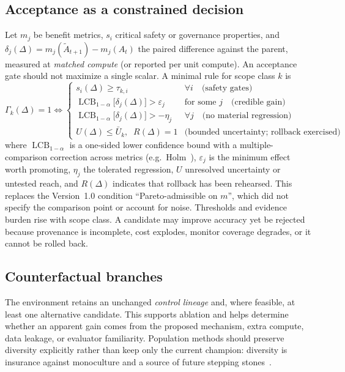\documentclass[11pt,a4paper]{article}
\newcommand{\LCB}{\operatorname{LCB}}
\begin{document}
\subsection{Acceptance as a constrained decision}
Let $m_j$ be benefit metrics, $s_i$ critical safety or governance properties, and $\delta_j(\Delta)=m_j(\tilde A_{t+1})-m_j(A_t)$ the paired difference against the parent, measured at \emph{matched compute} (or reported per unit compute). An acceptance gate should not maximize a single scalar. A minimal rule for scope class $k$ is
\begin{equation}
\Gamma_k(\Delta)=1 \iff
\begin{cases}
s_i(\Delta)\ge\tau_{k,i} & \forall i \quad\text{(safety gates)}\\
\LCB_{1-\alpha}\big[\delta_j(\Delta)\big]>\varepsilon_j & \text{for some } j \quad\text{(credible gain)}\\
\LCB_{1-\alpha}\big[\delta_j(\Delta)\big]>-\eta_j & \forall j \quad\text{(no material regression)}\\
U(\Delta)\le \bar U_k,\;\; R(\Delta)=1 & \text{(bounded uncertainty; rollback exercised)}
\end{cases}
\label{eq:accept}
\end{equation}
where $\LCB_{1-\alpha}$ is a one-sided lower confidence bound with a multiple-comparison correction across metrics (e.g.\ Holm~\cite{holm1979}), $\varepsilon_j$ is the minimum effect worth promoting, $\eta_j$ the tolerated regression, $U$ unresolved uncertainty or untested reach, and $R(\Delta)$ indicates that rollback has been rehearsed. This replaces the Version~1.0 condition ``Pareto-admissible on $m$'', which did not specify the comparison point or account for noise. Thresholds and evidence burden rise with scope class. A candidate may improve accuracy yet be rejected because provenance is incomplete, cost explodes, monitor coverage degrades, or it cannot be rolled back.

\subsection{Counterfactual branches}
The environment retains an unchanged \emph{control lineage} and, where feasible, at least one alternative candidate. This supports ablation and helps determine whether an apparent gain comes from the proposed mechanism, extra compute, data leakage, or evaluator familiarity. Population methods should preserve diversity explicitly rather than keep only the current champion: diversity is insurance against monoculture and a source of future stepping stones~\cite{lehman2011novelty}.
\end{document}
